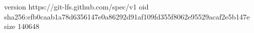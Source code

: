 version https://git-lfs.github.com/spec/v1
oid sha256:efb0caab1a78d6356147e0a86292d91af109fd355f8062e95529acaf2e5b147e
size 140648
